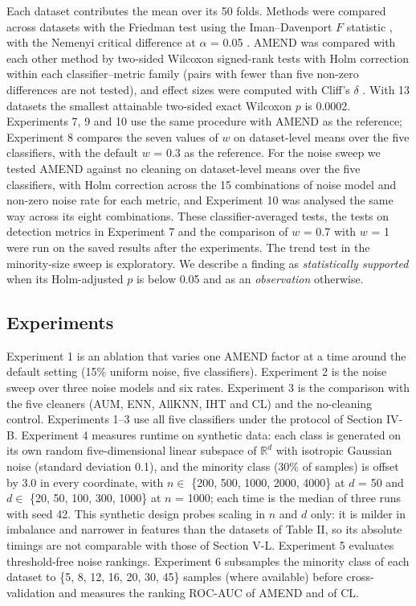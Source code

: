 \documentclass[conference]{IEEEtran}
\begin{document}
Each dataset contributes the mean over its 50 folds. Methods were compared across datasets with the Friedman test \cite{friedman1937} using the Iman--Davenport $F$ statistic \cite{iman1980}, with the Nemenyi critical difference at $\alpha $ = 0.05 \cite{demsar2006,nemenyi1963}. AMEND was compared with each other method by two-sided Wilcoxon signed-rank tests \cite{wilcoxon1945} with Holm correction \cite{holm1979} within each classifier--metric family (pairs with fewer than five non-zero differences are not tested), and effect sizes were computed with Cliff's $\delta $ \cite{cliff1993}. With 13 datasets the smallest attainable two-sided exact Wilcoxon $p$ is 0.0002. Experiments 7, 9 and 10 use the same procedure with AMEND as the reference; Experiment 8 compares the seven values of $w$ on dataset-level means over the five classifiers, with the default $w$ = 0.3 as the reference. For the noise sweep we tested AMEND against no cleaning on dataset-level means over the five classifiers, with Holm correction across the 15 combinations of noise model and non-zero noise rate for each metric, and Experiment 10 was analysed the same way across its eight combinations. These classifier-averaged tests, the tests on detection metrics in Experiment 7 and the comparison of $w$ = 0.7 with $w$ = 1 were run on the saved results after the experiments. The trend test in the minority-size sweep is exploratory. We describe a finding as \emph{statistically supported} when its Holm-adjusted $p$ is below 0.05 and as an \emph{observation} otherwise.

\subsection{Experiments}\label{sec:experiments}

Experiment 1 is an ablation that varies one AMEND factor at a time around the default setting (15\% uniform noise, five classifiers). Experiment 2 is the noise sweep over three noise models and six rates. Experiment 3 is the comparison with the five cleaners (AUM, ENN, AllKNN, IHT and CL) and the no-cleaning control. Experiments 1--3 use all five classifiers under the protocol of Section IV-B. Experiment 4 measures runtime on synthetic data: each class is generated on its own random five-dimensional linear subspace of $\mathbb{R}^{d}$ with isotropic Gaussian noise (standard deviation 0.1), and the minority class (30\% of samples) is offset by 3.0 in every coordinate, with $n \in $ \{200, 500, 1000, 2000, 4000\} at $d$ = 50 and $d \in $ \{20, 50, 100, 300, 1000\} at $n$ = 1000; each time is the median of three runs with seed 42. This synthetic design probes scaling in $n$ and $d$ only: it is milder in imbalance and narrower in features than the datasets of Table II, so its absolute timings are not comparable with those of Section V-L. Experiment 5 evaluates threshold-free noise rankings. Experiment 6 subsamples the minority class of each dataset to \{5, 8, 12, 16, 20, 30, 45\} samples (where available) before cross-validation and measures the ranking ROC-AUC of AMEND and of CL.
\end{document}
